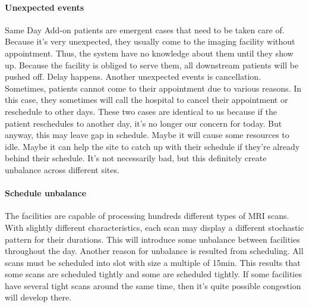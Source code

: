\paragraph{Unexpected events} Same Day Add-on patients are emergent cases that need to be taken care of. Because it's very unexpected, they usually come to the imaging facility without appointment. Thus, the system have no knowledge about them until they show up. Because the facility is obliged to serve them, all downstream patients will be pushed off. Delay happens. Another unexpected events is cancellation. Sometimes, patients cannot come to their appointment due to various reasons. In this case, they sometimes will call the hospital to cancel their appointment or reschedule to other days. These two cases are identical to us because if the patient reschedules to another day, it's no longer our concern for today. But anyway, this may leave gap in schedule. Maybe it will cause some resources to idle. Maybe it can help the site to catch up with their schedule if they're already behind their schedule. It's not necessarily bad, but this definitely create unbalance across different sites.

\paragraph{Schedule unbalance} The facilities are capable of processing hundreds different types of MRI scans. With slightly different characteristics, each scan may display a different stochastic pattern for their durations. This will introduce some unbalance between facilities throughout the day. Another reason for unbalance is resulted from scheduling. All scans must be scheduled into slot with size a multiple of 15min. This results that some scans are scheduled tightly and some are scheduled tightly. If some facilities have several tight scans around the same time, then it's quite possible congestion will develop there.